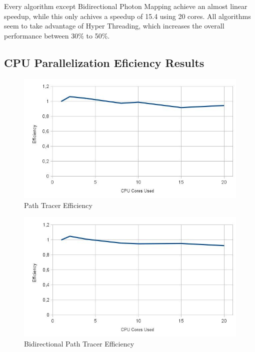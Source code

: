 Every algorithm except Bidirectional Photon Mapping achieve an almost linear speedup, while this only achives a speedup of 15.4 using 20 cores. All algorithms seem to take advantage of Hyper Threading, which increases the overall performance between 30\% to 50\%.

\subsection{CPU Parallelization Eficiency Results}

\begin{figure}[H]
\includegraphics[width=\linewidth]{img/ptEff.jpg}
\caption{\label{img:ptEff} Path Tracer Efficiency}
\end{figure}

\begin{figure}[H]
\includegraphics[width=\linewidth]{img/bptEff.jpg}
\caption{\label{img:bptEff} Bidirectional Path Tracer Efficiency}
\end{figure}

